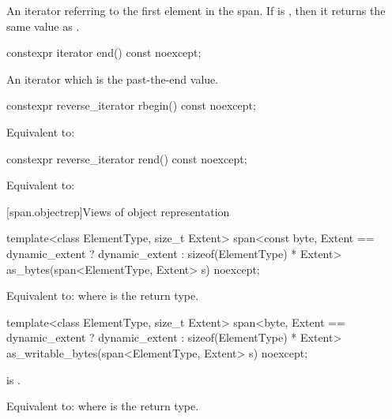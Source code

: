 \begin{itemdescr}
\pnum
\returns
An iterator referring to the first element in the span.
If  is , then it returns the
same value as .
\end{itemdescr}

%
\begin{itemdecl}
constexpr iterator end() const noexcept;
\end{itemdecl}

\begin{itemdescr}
\pnum
\returns
An iterator which is the past-the-end value.
\end{itemdescr}

%
\begin{itemdecl}
constexpr reverse_iterator rbegin() const noexcept;
\end{itemdecl}

\begin{itemdescr}
\pnum
\effects
Equivalent to: 
\end{itemdescr}

%
\begin{itemdecl}
constexpr reverse_iterator rend() const noexcept;
\end{itemdecl}

\begin{itemdescr}
\pnum
\effects
Equivalent to: 
\end{itemdescr}


[span.objectrep]{Views of object representation}

%
\begin{itemdecl}
template<class ElementType, size_t Extent>
  span<const byte, Extent == dynamic_extent ? dynamic_extent : sizeof(ElementType) * Extent>
    as_bytes(span<ElementType, Extent> s) noexcept;
\end{itemdecl}

\begin{itemdescr}
\pnum
\effects
Equivalent to: 
where  is the return type.
\end{itemdescr}

%
\begin{itemdecl}
template<class ElementType, size_t Extent>
  span<byte, Extent == dynamic_extent ? dynamic_extent : sizeof(ElementType) * Extent>
    as_writable_bytes(span<ElementType, Extent> s) noexcept;
\end{itemdecl}

\begin{itemdescr}
\pnum
\constraints
{} is .

\pnum
\effects
Equivalent to: 
where  is the return type.
\end{itemdescr}
